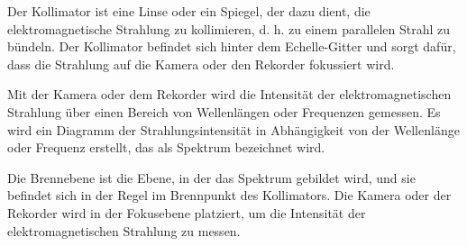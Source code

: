 \documentclass[12pt,english,ngerman]{scrartcl}
\begin{document}
Der Kollimator ist eine Linse oder ein Spiegel, der dazu dient, die elektromagnetische Strahlung zu kollimieren, d. h. zu einem parallelen Strahl zu bündeln. Der Kollimator befindet sich hinter dem Echelle-Gitter und sorgt dafür, dass die Strahlung auf die Kamera oder den Rekorder fokussiert wird.

Mit der Kamera oder dem Rekorder wird die Intensität der elektromagnetischen Strahlung über einen Bereich von Wellenlängen oder Frequenzen gemessen. Es wird ein Diagramm der Strahlungsintensität in Abhängigkeit von der Wellenlänge oder Frequenz erstellt, das als Spektrum bezeichnet wird.

Die Brennebene ist die Ebene, in der das Spektrum gebildet wird, und sie befindet sich in der Regel im Brennpunkt des Kollimators. Die Kamera oder der Rekorder wird in der Fokusebene platziert, um die Intensität der elektromagnetischen Strahlung zu messen.
\end{document}
